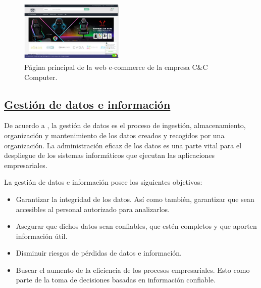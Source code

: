 \documentclass[10pt,conference]{IEEEtran}
\begin{document}
\begin{enumerate}
\begin{figure}[H]
 \begin{center}
       \includegraphics[width=5cm, height=3cm]{figuras/3.JPG}
      \caption{Página principal de la web e-commerce de la empresa C\&C Computer.}
      \label{f3} 
      \end{center}
\end{figure}
\end{enumerate} 
\subsection{\underline{\textbf{Gestión de datos e información}}}
De acuerdo a \citep{datos}, la gestión de datos es el proceso de ingestión, almacenamiento, organización y mantenimiento de los datos creados y recogidos por una organización. La administración eficaz de los datos es una parte vital para el despliegue de los sistemas informáticos que ejecutan las aplicaciones empresariales.

La gestión de datos e información posee los siguientes objetivos: 
\begin{itemize}
    \item Garantizar la integridad de los datos. Así como también, garantizar que sean accesibles al personal autorizado para analizarlos.
    \item Asegurar que dichos datos sean confiables, que estén completos y que aporten información útil.
    \item Disminuir riesgos de pérdidas de datos e información.
    \item Buscar el aumento de la eficiencia de los procesos empresariales. Esto como parte de la toma de decisiones basadas en información confiable.
\end{itemize}
\end{document}
